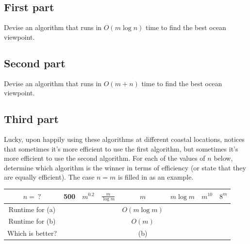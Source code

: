 \documentclass [12pt]{article}
\begin{document}
\subsection {First part } Devise an algorithm that runs in $O(m \log n)$ time to find the best ocean viewpoint. 


 

\subsection {Second part } Devise an algorithm that runs in $O(m + n)$ time to find the best ocean viewpoint. 


 

\subsection {Third part } Lucky, upon happily using these algorithms at different coastal locations, notices that sometimes it's more efficient to use the first algorithm, but sometimes it's more efficient to use the second algorithm. For each of the values of $n$ below, determine which algorithm is the winner in terms of efficiency (or state that they are equally efficient). The case $n=m$ is filled in as an example. 

\begin {center} \begin {tabular}{c|c|c|c|c|c|c|c} $n = \ ?$ & 500 & $m^{0.2}$ & $\frac {m}{\log m}$ & $m$ & $m \log m$ & $m^{10}$ & $8^m$ \\ \hline Runtime for (a) & \hspace {1cm} & \hspace {1cm} & \hspace {1cm} & $O(m \log m)$ & \hspace {1cm} & \hspace {1cm} & \hspace {1cm} \\ Runtime for (b) & \hspace {1cm} & \hspace {1cm} & \hspace {1cm} & $O(m)$ & \hspace {1cm} & \hspace {1cm} & \hspace {1cm} \\ Which is better? & \hspace {1cm} & \hspace {1cm} & \hspace {1cm} & (b) & \hspace {1cm} & \hspace {1cm} & \hspace {1cm} \\ \end {tabular} \end {center} 

\end{document}
